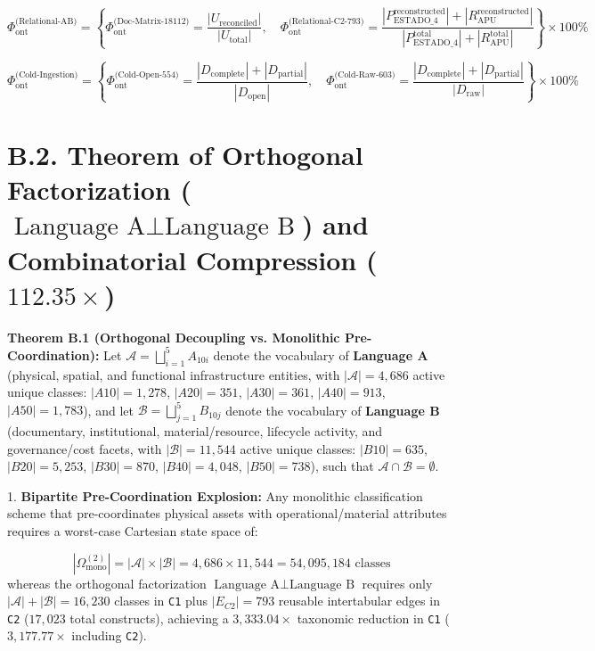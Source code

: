\documentclass[10pt,a4paper]{article}
\begin{document}
\begin{equation*}
\Phi_{\text{ont}}^{\text{(Relational-AB)}} = \left\{\Phi_{\text{ont}}^{\text{(Doc-Matrix-18112)}} = \frac{|U_{\text{reconciled}}|}{|U_{\text{total}}|}, \quad \Phi_{\text{ont}}^{\text{(Relational-C2-793)}} = \frac{|P_{\text{ESTADO\_4}}^{\text{reconstructed}}| + |R_{\text{APU}}^{\text{reconstructed}}|}{|P_{\text{ESTADO\_4}}^{\text{total}}| + |R_{\text{APU}}^{\text{total}}|}\right\} \times 100\%
\end{equation*}

\begin{equation*}
\Phi_{\text{ont}}^{\text{(Cold-Ingestion)}} = \left\{\Phi_{\text{ont}}^{\text{(Cold-Open-554)}} = \frac{|D_{\text{complete}}| + |D_{\text{partial}}|}{|D_{\text{open}}|}, \quad \Phi_{\text{ont}}^{\text{(Cold-Raw-603)}} = \frac{|D_{\text{complete}}| + |D_{\text{partial}}|}{|D_{\text{raw}}|}\right\} \times 100\%
\end{equation*}



\section*{B.2. Theorem of Orthogonal Factorization ($\text{Language A} \perp \text{Language B}$) and Combinatorial Compression ($112.35\times$)}

\textbf{Theorem B.1 (Orthogonal Decoupling vs. Monolithic Pre-Coordination):}
Let $\mathcal{A} = \bigsqcup_{i=1}^{5} A_{10i}$ denote the vocabulary of \textbf{Language A} (physical, spatial, and functional infrastructure entities, with $|\mathcal{A}| = 4,686$ active unique classes: $|A10|=1,278$, $|A20|=351$, $|A30|=361$, $|A40|=913$, $|A50|=1,783$), and let $\mathcal{B} = \bigsqcup_{j=1}^{5} B_{10j}$ denote the vocabulary of \textbf{Language B} (documentary, institutional, material/resource, lifecycle activity, and governance/cost facets, with $|\mathcal{B}| = 11,544$ active unique classes: $|B10|=635$, $|B20|=5,253$, $|B30|=870$, $|B40|=4,048$, $|B50|=738$), such that $\mathcal{A} \cap \mathcal{B} = \emptyset$.

1. \textbf{Bipartite Pre-Coordination Explosion:} Any monolithic classification scheme that pre-coordinates physical assets with operational/material attributes requires a worst-case Cartesian state space of:\par
\begin{equation*}
|\Omega_{\text{mono}}^{(2)}| = |\mathcal{A}| \times |\mathcal{B}| = 4,686 \times 11,544 = 54,095,184 \text{ classes}
\end{equation*}
whereas the orthogonal factorization $\text{Language A} \perp \text{Language B}$ requires only $|\mathcal{A}| + |\mathcal{B}| = 16,230$ classes in \texttt{C1} plus $|E_{C2}| = 793$ reusable intertabular edges in \texttt{C2} ($17,023$ total constructs), achieving a \textbf{$3,333.04\times$} taxonomic reduction in \texttt{C1} (\textbf{$3,177.77\times$} including \texttt{C2}).
\end{document}
